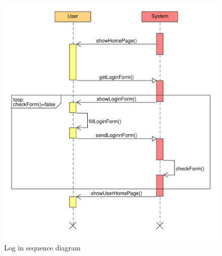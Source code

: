 \begin{figure}
\centering
\includegraphics[width=\textwidth]{tex-images/sequence-login}
\caption{Log in sequence diagram}
\end{figure}


